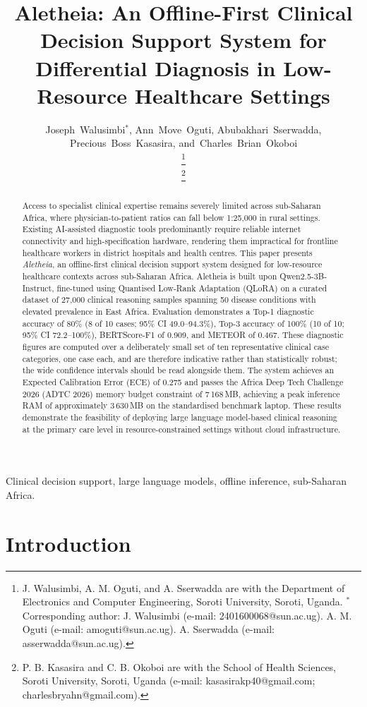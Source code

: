 \documentclass[journal]{IEEEtran}
\title{Aletheia: An Offline-First Clinical Decision Support System
for Differential Diagnosis in Low-Resource Healthcare Settings}
\author{Joseph~Walusimbi$^{*}$,
  Ann~Move~Oguti,
  Abubakhari~Sserwadda,
  Precious~Boss~Kasasira,
  and~Charles~Brian~Okoboi

\thanks{J. Walusimbi, A. M. Oguti, and A. Sserwadda are with the
Department of Electronics and Computer Engineering, Soroti University,
Soroti, Uganda. $^{*}$Corresponding author: J. Walusimbi
(e-mail: 2401600068@sun.ac.ug). A. M. Oguti (e-mail: amoguti@sun.ac.ug).
A. Sserwadda (e-mail: asserwadda@sun.ac.ug).}

\thanks{P. B. Kasasira and C. B. Okoboi are with the School of Health
Sciences, Soroti University, Soroti, Uganda
(e-mail: kasasirakp40@gmail.com; charlesbryahn@gmail.com).}}
\begin{document}
\maketitle

\begin{abstract}
Access to specialist clinical expertise remains severely limited
across sub-Saharan Africa, where physician-to-patient ratios can
fall below 1:25{,}000 in rural settings. Existing AI-assisted
diagnostic tools predominantly require reliable internet connectivity
and high-specification hardware, rendering them impractical for
frontline healthcare workers in district hospitals and health
centres. This paper presents \textit{Aletheia}, an offline-first
clinical decision support system designed for low-resource
healthcare contexts across sub-Saharan Africa. Aletheia is built
upon Qwen2.5-3B-Instruct, fine-tuned using Quantised Low-Rank
Adaptation (QLoRA) on a curated dataset of 27{,}000 clinical
reasoning samples spanning 50 disease conditions with elevated
prevalence in East Africa. Evaluation demonstrates a Top-1 diagnostic
accuracy of 80\% (8 of 10 cases; 95\% CI 49.0--94.3\%), Top-3
accuracy of 100\% (10 of 10; 95\% CI 72.2--100\%), BERTScore-F1 of
0.909, and METEOR of 0.467. These diagnostic figures are computed over
a deliberately small set of ten representative clinical case
categories, one case each, and are therefore indicative rather than
statistically robust; the wide confidence intervals should be read
alongside them. The system achieves an Expected Calibration Error (ECE)
of 0.275 and passes the Africa Deep Tech Challenge 2026 (ADTC 2026)
memory budget constraint of 7\,168\,MB, achieving
a peak inference RAM of approximately 3\,630\,MB on the standardised
benchmark laptop. These results demonstrate the
feasibility of deploying large language model-based clinical
reasoning at the primary care level in resource-constrained settings
without cloud infrastructure.
\end{abstract}

\begin{IEEEkeywords}
Clinical decision support, large language models, offline inference, sub-Saharan Africa.
\end{IEEEkeywords}

\section{Introduction}
\label{sec:intro}
\end{document}
